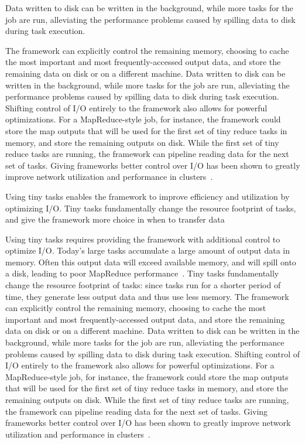 {%

Data written to disk can be written in the background, while more tasks for the
job are run, alleviating the performance problems caused by spilling data to disk
during task execution.


The framework can
explicitly control the remaining memory, choosing to cache the most important
and most frequently-accessed output data, and store the remaining data on disk
or on a different machine. Data written to disk can be written in the
background, while more tasks for the job are run, alleviating the performance
problems caused by spilling data to disk during task execution.
Shifting control of I/O entirely to the framework also allows for
powerful optimizations.  For a MapReduce-style job, for instance, the
framework could store the map outputs that will be used for the first set of
tiny reduce tasks in memory, and store the remaining outputs on disk. While
the first set of tiny reduce tasks are running, the framework can pipeline
reading data for the next set of tasks.  Giving frameworks better control over
I/O has been shown
to greatly improve network utilization and performance in
clusters~\cite{chowdhury2011managing, chowdhury2012coflow}.


Using tiny tasks enables the framework to improve efficiency and utilization
by optimizing I/O. Tiny tasks fundamentally change the resource footprint of
tasks, and give the framework more choice in when to transfer data 

Using tiny tasks requires providing the framework with additional control to optimize I/O.
Today's large tasks accumulate a large amount of output data in memory.
Often this output data will exceed available memory, 
and will spill onto a disk, leading to poor MapReduce
performance~\cite{lipcon2012optimizing}. Tiny tasks fundamentally change the
resource footprint of tasks: since tasks run for a shorter period of time,
they generate less output data and thus use less memory. The framework can
explicitly control the remaining memory, choosing to cache the most important
and most frequently-accessed output data, and store the remaining data on disk
or on a different machine. Data written to disk can be written in the
background, while more tasks for the job are run, alleviating the performance
problems caused by spilling data to disk during task execution.
Shifting control of I/O entirely to the framework also allows for
powerful optimizations.  For a MapReduce-style job, for instance, the
framework could store the map outputs that will be used for the first set of
tiny reduce tasks in memory, and store the remaining outputs on disk. While
the first set of tiny reduce tasks are running, the framework can pipeline
reading data for the next set of tasks.  Giving frameworks better control over
I/O has been shown
to greatly improve network utilization and performance in
clusters~\cite{chowdhury2011managing, chowdhury2012coflow}.
}

